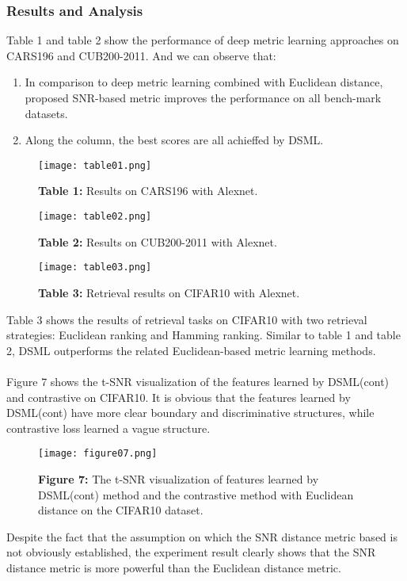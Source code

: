\documentclass[12pt,paper=a4]{scrartcl}
\theoremstyle{break}
\begin{document}
\subsubsection{Results and Analysis}
Table 1 and table 2 show the performance of deep metric learning approaches on CARS196 and CUB200-2011. And we can observe that:
\begin{enumerate}
\item In comparison to deep metric learning combined with Euclidean distance, proposed SNR-based metric improves the performance on all bench-mark datasets.
\item Along the column, the best scores are all achieffed by DSML.
\end{enumerate}
\begin{figure}[h]
	\centering
  \texttt{[image: table01.png]}
  \caption{\textbf{Table 1:} Results on CARS196 with Alexnet.\cite{source1}}
\end{figure}
\begin{figure}[h]
	\centering
  \texttt{[image: table02.png]}
  \caption{\textbf{Table 2:} Results on CUB200-2011 with Alexnet.\cite{source1}}
\end{figure}
\begin{figure}[h]
	\centering
  \texttt{[image: table03.png]}
  \caption{\textbf{Table 3:} Retrieval results on CIFAR10 with Alexnet.\cite{source1}}
\end{figure}
Table 3 shows the results of retrieval tasks on CIFAR10 with two retrieval strategies: Euclidean ranking and Hamming ranking. Similar to table 1 and table 2, DSML outperforms the related Euclidean-based metric learning methods. \\ \\
Figure 7 shows the t-SNR visualization of the features learned by DSML(cont) and contrastive on CIFAR10. It is obvious that the features learned by DSML(cont) have more clear boundary and discriminative structures, while contrastive loss learned a vague structure.
\begin{figure}[h]
	\centering
  \texttt{[image: figure07.png]}
  \caption{\textbf{Figure 7:} The t-SNR visualization of features learned by DSML(cont) method and the contrastive method with Euclidean distance on the CIFAR10 dataset.\cite{source1}}
\end{figure}
Despite the fact that the assumption on which the SNR distance metric based is not obviously established, the experiment result clearly shows that the SNR distance metric is more powerful than the Euclidean distance metric.
\end{document}
